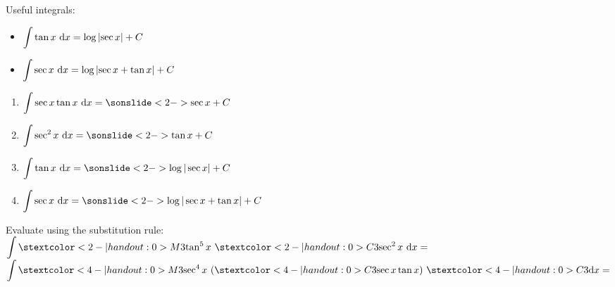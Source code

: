 \begin{frame}
Useful integrals:\\[1em]
\begin{itemize}
\item $\displaystyle\int \tan x ~\text{d} x=\log\left| \sec x \right|+C$
\item $\displaystyle\int \sec x ~\text{d} x=\log\left| \sec x + \tan x \right|+C$
\end{itemize}

\end{frame}
\begin{frame}[t]

\begin{enumerate}
\item $\ds\int \sec x \tan x ~\dee x =\sonslide<2->{\sec x +C}$
\vfill
\item $\ds\int \sec^2 x ~\dee x=\sonslide<2->{\tan x +C}$
\vfill
\item $\ds\int \tan x ~\dee x=\sonslide<2->{\log|\sec x| +C}$
\vfill
\item $\ds\int \sec x ~\dee x=\sonslide<2->{\log|\sec x+\tan x| +C}$
\end{enumerate}

\end{frame}
\begin{frame}[t]
 \nsNoSpace
{}

Evaluate using the substitution rule:\\[1em]

$\ds\int \stextcolor<2-|handout:0>{M3}{\tan^5 x}~ \stextcolor<2-|handout:0>{C3}{\sec^2 x ~\dee x}=$
\vfill
{}
$\ds\int \stextcolor<4-|handout:0>{M3}{\sec^4 x}\ (\stextcolor<4-|handout:0>{C3}{\sec x \tan x }) ~\stextcolor<4-|handout:0>{C3}{\dee x=}$

\end{frame}
